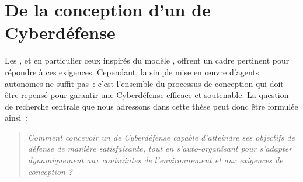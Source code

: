 

\section{De la conception d'un  de Cyberdéfense}\label{sec:problematique-sma}

Les , et en particulier ceux inspirés du modèle , offrent un cadre pertinent pour répondre à ces exigences. Cependant, la simple mise en œuvre d'agents autonomes ne suffit pas~: c'est l'ensemble du processus de conception qui doit être repensé pour garantir une Cyberdéfense efficace et soutenable.
La question de recherche centrale que nous adressons dans cette thèse peut donc être formulée ainsi~:

\begin{quote}
  \emph{Comment concevoir un  de Cyberdéfense capable d'atteindre ses objectifs de défense de manière satisfaisante, tout en s'auto-organisant pour s'adapter dynamiquement aux contraintes de l'environnement et aux exigences de conception ?}
\end{quote}

\medskip

